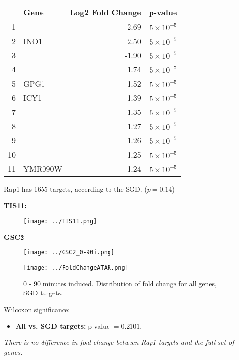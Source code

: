 \documentclass{beamer}
\begin{document}
\begin{frame}
    \begin{table}[ht]
        \centering
        \begin{tabular}{rlrr}
            \toprule
            & Gene & Log2 Fold Change & p-value \\ 
            \midrule
            1 & \textbf{\color{red}{TIS11}} & 2.69 & $5 \times 10^{-5}$ \\ 
            2 & INO1 & 2.50 & $5 \times 10^{-5}$\\ 
            3 & \textbf{\color{red}{SSA2}} & -1.90 & $5 \times 10^{-5}$ \\ 
            4 & \textbf{\color{red}{YEL073C}} & 1.74 & $5 \times 10^{-5}$ \\ 
            5 & GPG1 & 1.52 & $5 \times 10^{-5}$ \\ 
            6 & ICY1 & 1.39 & $5 \times 10^{-5}$ \\ 
            7 & \textbf{\color{red}{MRS3}} & 1.35 & $5 \times 10^{-5}$ \\ 
            8 & \textbf{\color{red}{YOR387C}} & 1.27 & $5 \times 10^{-5}$ \\ 
            9 & \textbf{\color{red}{PDR12}} & 1.26 & $5 \times 10^{-5}$ \\ 
            10 & \textbf{\color{red}{GSC2}} & 1.25 & $5 \times 10^{-5}$ \\ 
            11 & YMR090W & 1.24 & $5 \times 10^{-5}$ \\ 
            \bottomrule
        \end{tabular}
    \end{table}
    Rap1 has 1655 targets, according to the SGD. ($p = 0.14$)
\end{frame}

\begin{frame}
    \textbf{TIS11:}
    \begin{figure}[ht!]
        \centering
        \texttt{[image: ../TIS11.png]}
        \label{fig:tis11}
    \end{figure}
    \textbf{GSC2}
    \begin{figure}[ht!]
        \centering
        \texttt{[image: ../GSC2\_0-90i.png]}
        \label{fig:gsc2}
    \end{figure}
\end{frame}

\begin{frame}
    \begin{figure}[ht!]
            \centering
            \texttt{[image: ../FoldChangeATAR.png]}
            \caption{0 - 90 minutes induced. Distribution of fold change for {\color{gray} all genes}, {\color{blue} SGD targets}.}
            \label{fig:all.tar}
        \end{figure}
    Wilcoxon significance:
    \begin{itemize}
        \item \textbf{All vs. SGD targets:} p-value $= 0.2101$.
    \end{itemize}
    \emph{There is no difference in fold change between Rap1 targets and the full set of genes.}
\end{frame}
\end{document}
